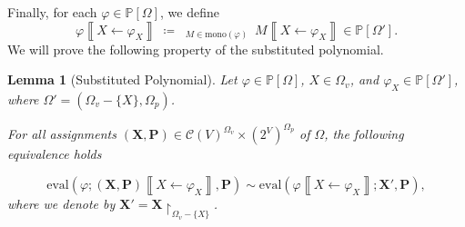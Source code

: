 \documentclass[10pt]{amsart}
\theoremstyle{plain}
\newtheorem{lemma}{Lemma}[section]
\theoremstyle{definition}
\providecommand{\cC}[0]{\ensuremath{\mathcal C}\xspace}
\providecommand{\bP}[0]{\ensuremath{\mathbf P}\xspace}
\providecommand{\bX}[0]{\ensuremath{\mathbf X}\xspace}
\providecommand{\defeq}[0]{\ensuremath{\;\coloneqq\;}\xspace}
\providecommand{\Cplus}[0]{\ensuremath{\mathop{\widehat{\bigoplus}}}\xspace}
\providecommand{\convset}[0]{\ensuremath{\cC}\xspace}
\providecommand{\evalmap}[0]{\ensuremath{\mathrm{eval}}\xspace}
\providecommand{\mono}[0]{\ensuremath{\mathrm{mono}}\xspace}
\begin{document}
Finally, for each $\varphi \in \mathbb{P}[\Omega]$, we define 
    \begin{equation}\label{eqn:poly-substitute-def}
        \varphi\left\llbracket X\gets \varphi_X\right\rrbracket \defeq 
            \Cplus_{M\in \mono(\varphi)} ~ M\left\llbracket X\gets \varphi_X\right\rrbracket \in \mathbb{P}[\Omega'].         \end{equation}
We will prove the following property of the substituted polynomial.
\begin{lemma}[Substituted Polynomial]
\label{lem:substitute-poly-property}
    Let $\varphi \in \mathbb{P}[\Omega]$, $X\in\Omega_v$, and  $\varphi_X \in \mathbb{P}[\Omega']$, where $\Omega' = (\Omega_v - \{X\},\Omega_p)$.
    
    For all assignments $(\bX,\bP) \in \convset(V)^{\Omega_v} \times (2^V)^{\Omega_p}$ of $\Omega$, the following 
    equivalence holds 

    
        $$ \evalmap\left(\varphi ; (\bX,\bP)\left\llbracket X\gets \varphi_X\right\rrbracket,\bP \right) \sim 
            \evalmap\left(\varphi\left\llbracket X\gets \varphi_X \right\rrbracket ; \bX', \bP\right),$$
            where we denote by $\bX' = \bX\restriction_{\Omega_v - \{X\}}$.

\end{lemma}
\end{document}
